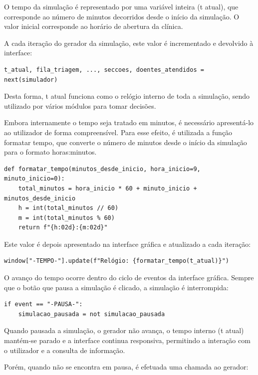 \documentclass[12pt,a4paper]{article} %
\begin{document}
    O tempo da simulação é representado por uma variável inteira (t atual), que corresponde ao número de minutos decorridos desde o início da simulação. O valor inicial corresponde ao horário de abertura da clínica.

    A cada iteração do gerador da simulação, este valor é incrementado e devolvido à interface:
\begin{verbatim}
t_atual, fila_triagem, ..., seccoes, doentes_atendidos = next(simulador)

\end{verbatim}

    Desta forma, t atual funciona como o relógio interno de toda a simulação, sendo utilizado por vários módulos para tomar decisões.

    Embora internamente o tempo seja tratado em minutos, é necessário apresentá-lo ao utilizador de forma compreensível. Para esse efeito, é utilizada a função formatar tempo, que converte o número de minutos desde o início da simulação para o formato horas:minutos.

\begin{verbatim}
def formatar_tempo(minutos_desde_inicio, hora_inicio=9, minuto_inicio=0):
    total_minutos = hora_inicio * 60 + minuto_inicio + minutos_desde_inicio
    h = int(total_minutos // 60)
    m = int(total_minutos % 60)
    return f"{h:02d}:{m:02d}"
\end{verbatim}

    Este valor é depois apresentado na interface gráfica e atualizado a cada iteração:

\begin{verbatim}
window["-TEMPO-"].update(f"Relógio: {formatar_tempo(t_atual)}")
\end{verbatim}

    \medskip
    O avanço do tempo ocorre dentro do ciclo de eventos da interface gráfica. Sempre que o botão que pausa a simulação é clicado, a simulação é interrompida:

    \begin{verbatim}
if event == "-PAUSA-":
    simulacao_pausada = not simulacao_pausada
    \end{verbatim}

    Quando pausada a simulação, o gerador não avança, o tempo interno (t atual) mantém-se parado e a interface continua responsiva, permitindo a interação com o utilizador e a consulta de informação.

    \medskip
    Porém, quando não se encontra em pausa, é efetuada uma chamada ao gerador:
\end{document}
